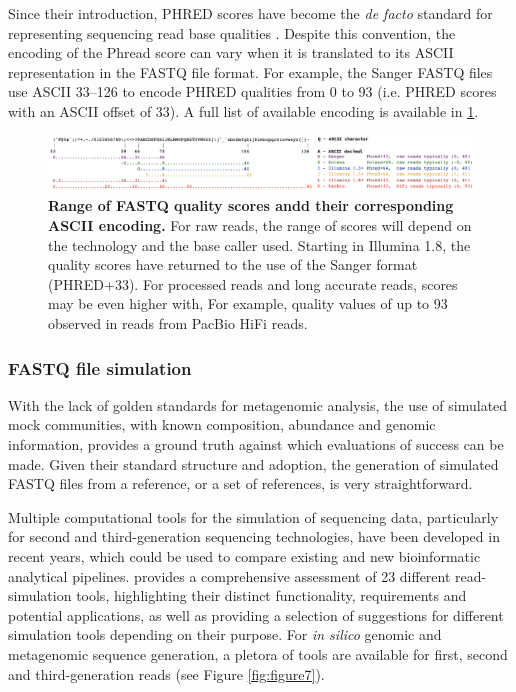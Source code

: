 Since their introduction, PHRED scores have become the \textit{de facto} standard for representing sequencing read base qualities \citep{cock_sanger_2010}. Despite this convention, the encoding of the Phread score can vary when it is translated to its ASCII representation in the FASTQ file format. For example, the Sanger FASTQ files use ASCII 33–126 to encode PHRED qualities from 0 to 93 (i.e. PHRED scores with an ASCII offset of 33). A full list of available encoding is available in \ref{fig:figure6}. 

\begin{figure}[h!]
\centering
\includegraphics[width=\textwidth]{figures/introduction/Figure 6.png}
\caption{\textbf{Range of FASTQ quality scores andd their corresponding ASCII encoding.} For raw reads, the range of scores will depend on the technology and the base caller used. Starting in Illumina 1.8, the quality scores have returned to the use of the Sanger format (PHRED+33). For processed reads and long accurate reads, scores may be even higher with, For example, quality values of up to 93 observed in reads from PacBio HiFi reads.}
\label{fig:figure6}
\end{figure}

\subsubsection{FASTQ file simulation} \label{ssec:_intro_fastq_sim}

With the lack of golden standards for metagenomic analysis, the use of simulated mock communities, with known composition, abundance and genomic information, provides a ground truth against which evaluations of success can be made. Given their standard structure and adoption, the generation of simulated FASTQ files from a reference, or a set of references, is very straightforward. 

Multiple computational tools for the simulation of sequencing data, particularly for second and third-generation sequencing technologies, have been developed in recent years, which could be used to compare existing and new bioinformatic analytical pipelines. \cite{escalona_comparison_2016} provides a comprehensive assessment of 23 different read-simulation tools,  highlighting their distinct functionality, requirements and potential applications, as well as providing a selection of suggestions for different simulation tools depending on their purpose. For \textit{in silico} genomic and metagenomic sequence generation, a pletora of tools are available for first, second and third-generation reads (see Figure \ref{fig:figure7}).

